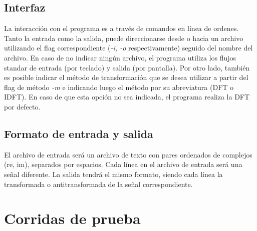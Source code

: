 \documentclass[12pt,a4paper]{report}
\begin{document}
		\subsection{Interfaz}

			\indent La interacción con el programa es a través de comandos en línea de ordenes. Tanto la entrada 
			como la salida, puede direccionarse desde o hacia un archivo utilizando el flag correspondiente (\textit{-i, -o}
			respectivamente) seguido del nombre del archivo. En caso de no indicar ningún archivo, el programa utiliza los 
			flujos standar de entrada (por teclado) y salida (por pantalla). Por otro lado, también es posible indicar el método 
			de transformación que se desea utilizar a partir del flag de método \textit{-m} e indicando luego el método por su
			abreviatura (DFT o IDFT). En caso de que esta opción no sea indicada, el programa realiza la DFT por defecto.

		\subsection{Formato de entrada y salida}

			\indent El archivo de entrada será un archivo de texto con pares ordenados de complejos (re, im), separados por
			espacios. Cada línea en el archivo de entrada será una señal diferente. La salida tendrá el mismo formato, siendo 
			cada línea la transformada o antitransformada de la señal correspondiente. 


	\section{Corridas de prueba}
	 
\end{document}
